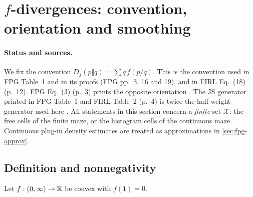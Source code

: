 \section{\texorpdfstring{$f$}{f}-divergences: convention, orientation and smoothing}\label{sec:div}

\paragraph{Status and sources.}
We fix the convention $D_f(p\Vert q)=\sum q\,f(p/q)$.
This is the convention used in FPG Table~1 and in its proofs (FPG pp.~3, 16 and 19), and in FIRL Eq.~(18) (p.~12).
FPG Eq.~(3) (p.~3) prints the opposite orientation .
The JS generator printed in FPG Table~1 and FIRL Table~2 (p.~4) is twice the half-weight generator used here .
All statements in this section concern a \emph{finite} set $\mathcal X$: the free cells of the finite maze, or the histogram cells of the continuous maze.
Continuous plug-in density estimates are treated as approximations in \cref{sec:fpg-approx}.

\subsection{Definition and nonnegativity}

Let $f:(0,\infty)\to\mathbb{R}$ be convex with $f(1)=0$.

